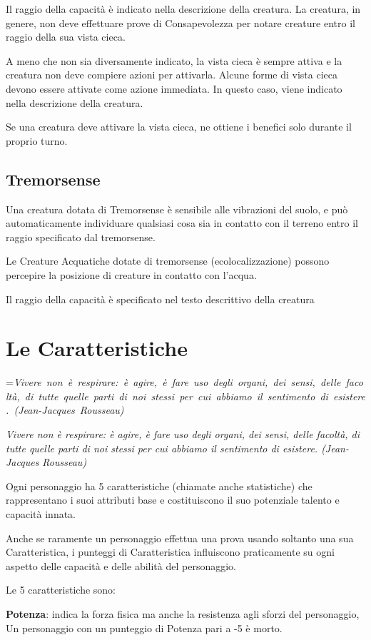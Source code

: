 \documentclass[a4paper,11pt,twoside,openany]{book}
\makeatletter
\newcommand{\mybox}[1]{%
	\setbox0=\hbox{#1}%
	\setlength{\@tempdima}{\dimexpr\wd0+13pt}%
	\begin{tcolorbox}[boxrule=0.5pt,arc=4pt, breakable,enhanced,
		left=6pt,right=6pt,top=6pt,bottom=6pt,boxsep=0pt,width=\@tempdima]
		#1
	\end{tcolorbox}
}
\makeatother
\begin{document}
Il raggio della capacità è indicato nella descrizione della creatura. La creatura, in genere, non deve effettuare prove di Consapevolezza per notare creature entro il raggio della sua vista cieca.

A meno che non sia diversamente indicato, la vista cieca è sempre attiva e la creatura non deve compiere azioni per attivarla. Alcune forme di vista cieca devono essere attivate come azione immediata. In questo caso, viene indicato nella descrizione della creatura.

Se una creatura deve attivare la vista cieca, ne ottiene i benefici solo durante il proprio turno.

\subsection{Tremorsense}
Una creatura dotata di Tremorsense è sensibile alle vibrazioni del suolo, e può automaticamente individuare qualsiasi cosa sia in contatto con il terreno entro il raggio specificato dal tremorsense.

Le Creature Acquatiche dotate di tremorsense (ecolocalizzazione) possono percepire la posizione di creature in contatto con l’acqua.

Il raggio della capacità è specificato nel testo descrittivo della creatura

\pagebreak

\section{Le Caratteristiche}

\label{le-caratteristiche}

\mybox{\textit{Vivere non è respirare: è agire, è fare uso degli organi, dei sensi, delle facoltà, di tutte quelle parti di noi stessi per cui abbiamo il sentimento di esistere. (Jean-Jacques Rousseau)
}}\medskip


Ogni personaggio ha 5 caratteristiche (chiamate anche statistiche) che rappresentano i suoi attributi base e costituiscono il suo potenziale talento e capacità innata. 

Anche se raramente un personaggio effettua una prova usando soltanto una sua Caratteristica, i punteggi di Caratteristica influiscono praticamente su ogni aspetto delle capacità e delle abilità del personaggio.

Le 5 caratteristiche sono:

\textbf{Potenza}: indica la forza fisica ma anche la resistenza agli sforzi del personaggio, Un personaggio con un punteggio di Potenza pari a -5 è morto.
\end{document}
